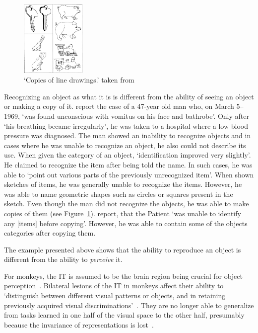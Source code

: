 \documentclass[11pt]{article}
\begin{document}
    \begin{figure}
        \begin{center}
            \includegraphics[width=0.28\textwidth]{images/rubens_sketches.jpg}
        \end{center}
        \caption[Copies of line drawings]{\enquote*{Copies of line drawings.} taken from \citet{rubens1971associative}}
        \label{fig:copies_line_drawings}
    \end{figure}
    Recognizing an object as what it is is different from the ability of seeing an object or making a copy of it.
    \citet{rubens1971associative} report the case of a 47-year old man who, on March 5--1969, \enquote*{was found unconscious with vomitus on his face and bathrobe}.
    Only after \enquote*{his breathing became irregularly}, he was taken to a hospital where a low blood pressure was diagnosed.
    The man showed an inability to recognize objects and in cases where he was unable to recognize an object, he also could not describe its use.
    When given the category of an object, \enquote*{identification improved very slightly}.
    He claimed to recognize the item after being told the name.
    In such cases, he was able to \enquote*{point out various parts of the previously unrecognized item}.
    When shown sketches of items, he was generally unable to recognize the items.
    However, he was able to name geometric shapes such as circles or squares present in the sketch.
    Even though the man did not recognize the objects, he was able to make copies of them (see Figure~\ref{fig:copies_line_drawings}).
    \citet{rubens1971associative} report, that the Patient \enquote*{was unable to identify any [items] before copying}.
    However, he was able to contain some of the objects categories after copying them.

    The example presented above shows that the ability to reproduce an object is different from the ability to \textit{perceive} it.

    For monkeys, the \ac{IT} is assumed to be the brain region being crucial for object perception~\citep[pp. 1070, 1071]{squire2012fundamental}.
    Bilateral lesions of the \ac{IT} in monkeys affect their ability to \enquote*{distinguish between different visual patterns or objects, and in retaining previously acquired visual discriminations}~\citep[p. 1070]{squire2012fundamental}.
    They are no longer able to generalize from tasks learned in one half of the visual space to the other half, presumably because the invariance of representations is lost~\citep[p. 1070]{squire2012fundamental}.
\end{document}
